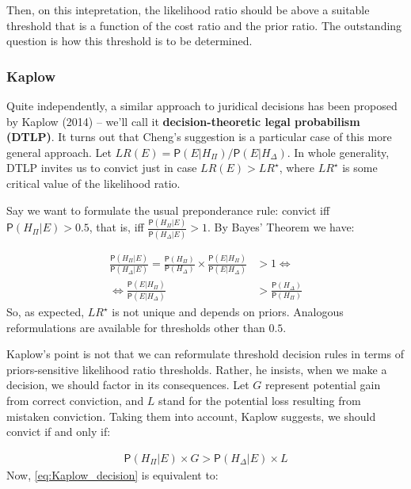\documentclass[10pt,dvipsnames,enabledeprecatedfontcommands]{scrartcl}
\newcommand{\pr}[1]{\mathsf{P}(#1)}
\begin{document}
Then, on this intepretation, the likelihood ratio should be above a
suitable threshold that is a function of the cost ratio and the prior
ratio. The outstanding question is how this threshold is to be
determined.

\hypertarget{kaplow}{%
\subsubsection{Kaplow}\label{kaplow}}

Quite independently, a similar approach to juridical decisions has been
proposed by Kaplow (2014) -- we'll call it
\textbf{decision-theoretic legal probabilism (DTLP)}. It turns out that
Cheng's suggestion is a particular case of this more general approach.
Let \(LR(E)=\pr{E\vert H_\Pi}/\pr{E\vert H_\Delta}\). In whole
generality, DTLP invites us to convict just in case \(LR(E)>LR^\star\),
where \(LR^\star\) is some critical value of the likelihood ratio.

Say we want to formulate the usual preponderance rule: convict iff
\(\pr{H_\Pi\vert E}>0.5\), that is, iff
\(\frac{\pr{H_\Pi\vert E}}{\pr{H_\Delta\vert E}}>1\). By Bayes' Theorem
we have:

\vspace{-6mm}

\begin{align*}
\frac{\pr{H_\Pi\vert E}}{\pr{H_\Delta\vert E}} =  \frac{\pr{H_\Pi}}{\pr{H_\Delta}}\times \frac{\pr{E\vert H_\Pi}}{\pr{E\vert H_\Delta}} &>1 \Leftrightarrow\\
  \Leftrightarrow \frac{\pr{E\vert H_\Pi}}{\pr{E\vert H_\Delta}} &> \frac{\pr{H_\Delta}}{\pr{H_\Pi}} 
 \end{align*} \noindent So, as expected, \(LR^\star\) is not unique and
depends on priors. Analogous reformulations are available for thresholds
other than \(0.5\).

Kaplow's point is not that we can reformulate threshold decision rules
in terms of priors-sensitive likelihood ratio thresholds. Rather, he
insists, when we make a decision, we should factor in its consequences.
Let \(G\) represent potential gain from correct conviction, and \(L\)
stand for the potential loss resulting from mistaken conviction. Taking
them into account, Kaplow suggests, we should convict if and only if:

\vspace{-6mm}

\begin{align}
\label{eq:Kaplow_decision}
\pr{H_\Pi\vert E}\times G > \pr{H_\Delta\vert E}\times L
\end{align} \noindent Now, \eqref{eq:Kaplow_decision} is equivalent to:
\end{document}

